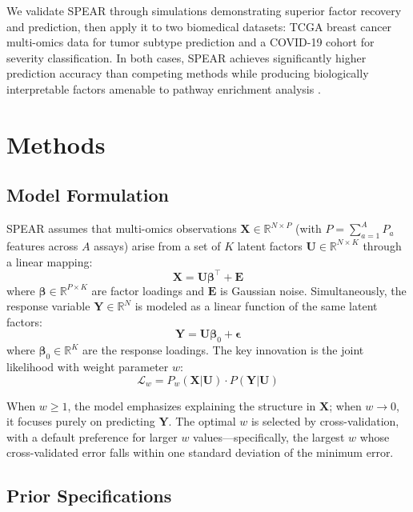 \documentclass[11pt]{article}
\begin{document}
We validate SPEAR through simulations demonstrating superior factor recovery and prediction, then apply it to two biomedical datasets: TCGA breast cancer multi-omics data for tumor subtype prediction and a COVID-19 cohort for severity classification. In both cases, SPEAR achieves significantly higher prediction accuracy than competing methods while producing biologically interpretable factors amenable to pathway enrichment analysis \citep{subramanian2005gsea}.

\section{Methods}

\subsection{Model Formulation}

SPEAR assumes that multi-omics observations $\mathbf{X} \in \mathbb{R}^{N \times P}$ (with $P = \sum_{a=1}^{A} P_a$ features across $A$ assays) arise from a set of $K$ latent factors $\mathbf{U} \in \mathbb{R}^{N \times K}$ through a linear mapping:
\begin{equation}
\mathbf{X} = \mathbf{U} \boldsymbol{\beta}^\top + \mathbf{E}
\end{equation}
where $\boldsymbol{\beta} \in \mathbb{R}^{P \times K}$ are factor loadings and $\mathbf{E}$ is Gaussian noise. Simultaneously, the response variable $\mathbf{Y} \in \mathbb{R}^{N}$ is modeled as a linear function of the same latent factors:
\begin{equation}
\mathbf{Y} = \mathbf{U} \boldsymbol{\beta}_0 + \boldsymbol{\epsilon}
\end{equation}
where $\boldsymbol{\beta}_0 \in \mathbb{R}^{K}$ are the response loadings. The key innovation is the joint likelihood with weight parameter $w$:
\begin{equation}
\mathcal{L}_w = P_w(\mathbf{X} | \mathbf{U}) \cdot P(\mathbf{Y} | \mathbf{U})
\end{equation}

When $w \geq 1$, the model emphasizes explaining the structure in $\mathbf{X}$; when $w \to 0$, it focuses purely on predicting $\mathbf{Y}$. The optimal $w$ is selected by cross-validation, with a default preference for larger $w$ values---specifically, the largest $w$ whose cross-validated error falls within one standard deviation of the minimum error.

\subsection{Prior Specifications}
\end{document}
